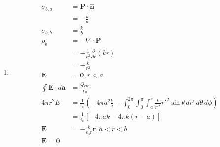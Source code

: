 \documentclass{article}
\renewcommand{\vec}[1]{\boldsymbol{\mathbf{#1}}}
\newcommand{\uvec}[1]{\hat{\vec{#1}}}
\begin{document}
\begin{enumerate}
  \item

        \begin{align*}
          \sigma_{b,a}                  & = \vec{P} \cdot \uvec{n}                                                                                                                                     \\
                                        & = -\frac{k}{a}                                                                                                                                               \\
          \sigma_{b,b}                  & = \frac{k}{b}                                                                                                                                                \\
          \rho_b                        & = -\nabla \cdot \vec{P}                                                                                                                                      \\
                                        & = -\frac{1}{r^2} \frac{\partial}{\partial r} (k r)                                                                                                           \\
                                        & = -\frac{k}{r^2}                                                                                                                                             \\
          \vec{E}                       & = \vec{0}, r < a                                                                                                                                             \\
          \oint \vec{E} \cdot d \vec{a} & = \frac{Q_\text{enc}}{\epsilon_0}                                                                                                                            \\
          4 \pi r^2 E                   & = \frac{1}{\epsilon_0} \left( -4 \pi a^2 \frac{k}{a} - \int_0^{2 \pi} \int_0^\pi \int_a^r \frac{k}{r'^2} r'^2 \sin \theta \,d r' \,d \theta \,d \phi \right) \\
                                        & = \frac{1}{\epsilon_0} [-4 \pi a k - 4 \pi k (r - a)]                                                                                                        \\
          \vec{E}                       & = -\frac{k}{\epsilon_0 r} \uvec{r}, a < r < b                                                                                                                \\
          \vec{E} = \vec{0}
        \end{align*}


\end{enumerate}
\end{document}
